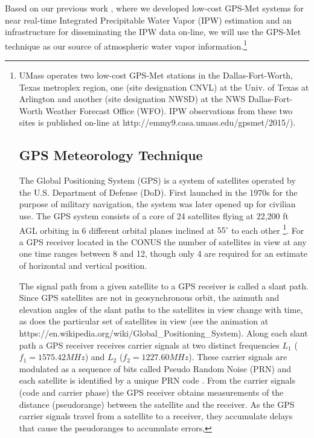 \documentclass[proposal]{umassthesis}
\begin{document}
Based on our previous work \cite{nagarajan2015lowcost}, where we developed low-cost GPS-Met systems for near real-time Integrated Precipitable Water Vapor (IPW) estimation and an infrastructure for disseminating the IPW data on-line, we will use the GPS-Met technique as our source of atmospheric water vapor information.\footnote{UMass operates two low-cost GPS-Met stations in the Dallas-Fort-Worth, Texas metroplex region, one (site designation CNVL) at the Univ. of Texas at Arlington and another (site designation NWSD) at the NWS Dallas-Fort-Worth Weather Forecast Office (WFO). IPW observations from these two sites is published on-line at http://emmy9.casa.umass.edu/gpsmet/2015/).

\subsection{GPS Meteorology Technique}

The Global Positioning System (GPS) is a system of satellites operated by the U.S. Department of Defense (DoD). First launched in the 1970s for the purpose of military navigation, the system was later opened up for civilian use. The GPS system consists of a core of 24 satellites flying at 22,200 ft AGL orbiting in 6 different orbital planes inclined at $55^{\circ}$ to each other \footnote{http://www.gps.gov/systems/gps/space/}. For a GPS receiver located in the CONUS the number of satellites in view at any one time ranges between 8 and 12, though only 4 are required for an estimate of horizontal and vertical position.

The signal path from a given satellite to a GPS receiver is called a slant path. Since GPS satellites are not in geosynchronous orbit, the azimuth and elevation angles of the slant paths to the satellites in view change with time, as does the particular set of satellites in view (see the animation at https://en.wikipedia.org/wiki/Global_Positioning_System). Along each slant path a GPS receiver receives carrier signals at two distinct frequencies $L_1$ ($f_1 = 1575.42 MHz$) and $L_2$ ($f_2 = 1227.60 MHz$). These carrier signals are modulated as a sequence of bits called Pseudo Random Noise (PRN) and each satellite is identified by a unique PRN code \cite{hoffman2008gnss}. From the carrier signals (code and carrier phase) the GPS receiver obtains measurements of the distance (pseudorange) between the satellite and the receiver. As the GPS carrier signals travel from a satellite to a receiver, they accumulate delays that cause the pseudoranges to accumulate errors,

}
\end{document}
